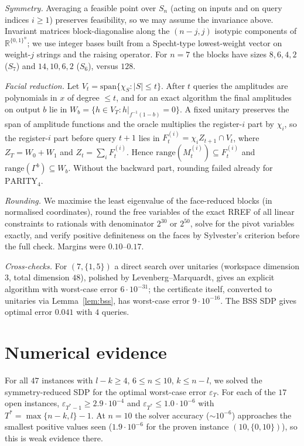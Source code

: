 \documentclass[11pt]{article}
\theoremstyle{remark}
\begin{document}
\emph{Symmetry.} Averaging a feasible point over $S_n$ (acting on inputs and on query indices $i\ge1$)
preserves feasibility, so we may assume the invariance above. Invariant matrices block-diagonalise along
the $(n-j,j)$ isotypic components of $\mathbb R^{\{0,1\}^n}$; we use integer bases built from a Specht-type
lowest-weight vector on weight-$j$ strings and the raising operator. For $n=7$ the blocks have sizes
$8,6,4,2$ ($S_7$) and $14,10,6,2$ ($S_6$), versus $128$.

\emph{Facial reduction.} Let $V_t=\mathrm{span}\{\chi_S:|S|\le t\}$. After $t$ queries the amplitudes are
polynomials in $x$ of degree $\le t$, and for an exact algorithm the final amplitudes on output $b$ lie in
$W_b=\{h\in V_T:h|_{f^{-1}(1-b)}=0\}$. A fixed unitary preserves the span of amplitude functions and the
oracle multiplies the register-$i$ part by $\chi_i$, so the register-$i$ part before query $t+1$ lies in
$F_t^{(i)}=\chi_iZ_{t+1}\cap V_t$, where $Z_T=W_0+W_1$ and $Z_t=\sum_iF_t^{(i)}$. Hence
$\mathrm{range}(M_t^{(i)})\subseteq F_t^{(i)}$ and $\mathrm{range}(\Gamma^b)\subseteq W_b$. Without the
backward part, rounding failed already for $\mathrm{PARITY}_4$.

\emph{Rounding.} We maximise the least eigenvalue of the face-reduced blocks (in normalised coordinates),
round the free variables of the exact RREF of all linear constraints to rationals with denominator
$2^{30}$ or $2^{50}$, solve for the pivot variables exactly, and verify positive definiteness on the
faces by Sylvester's criterion before the full check. Margins were $0.10$--$0.17$.

\emph{Cross-checks.} For $(7,\{1,5\})$ a direct search over unitaries (workspace dimension $3$, total
dimension $48$), polished by Levenberg--Marquardt, gives an explicit algorithm with worst-case error
$6\cdot10^{-31}$; the certificate itself, converted to unitaries via Lemma~\ref{lem:bss}, has worst-case
error $9\cdot10^{-16}$. The BSS SDP gives optimal error $0.041$ with $4$ queries.

\section{Numerical evidence}
For all $47$ instances with $l-k\ge4$, $6\le n\le10$, $k\le n-l$, we solved the symmetry-reduced SDP for the
optimal worst-case error $\varepsilon_T$. For each of the $17$ open instances,
$\varepsilon_{T^*-1}\ge2.9\cdot10^{-4}$ and $\varepsilon_{T^*}\le1.0\cdot10^{-6}$ with
$T^*=\max\{n-k,l\}-1$. At $n=10$ the solver accuracy ($\sim10^{-6}$) approaches the smallest positive
values seen ($1.9\cdot10^{-6}$ for the proven instance $(10,\{0,10\})$), so this is weak evidence there.
\end{document}
